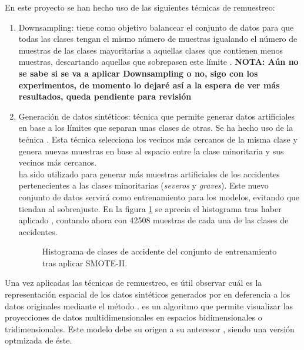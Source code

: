             En este proyecto se han hecho uso de las siguientes técnicas de remuestreo:

            
            \begin{enumerate}



                \item Downsampling: tiene como objetivo balancear el conjunto de datos para que todas las clases tengan el mismo número de muestras igualando el número de muestras de las clases mayoritarias a aquellas clases que contienen menos muestras, descartando aquellas que sobrepasen este límite \cite{Downsampling}. \textbf{NOTA: Aún no se sabe si se va a aplicar Downsampling o no, sigo con los experimentos, de momento lo dejaré así a la espera de ver más resultados, queda pendiente para revisión}
                

                \item Generación de datos sintéticos: técnica que permite generar datos artificiales en base a los límites que separan unas clases de otras. Se ha hecho uso de la tećnica  \cite{SMOTEII}. Esta técnica selecciona los vecinos más cercanos de la misma clase y genera nuevas muestras en base al espacio entre la clase minoritaria y sus vecinos más cercanos.\\

                 ha sido utilizado para generar más muestras artificiales de los accidentes pertenecientes a las clases minoritarias (\textit{severos} y \textit{graves}). Este nuevo conjunto de datos servirá como entrenamiento para los modelos, evitando que tiendan al sobreajuste. En la figura \ref{SMOTEIIDataHistogramImage} se aprecia el histograma tras haber aplicado , contando ahora con 42508 muestras de cada una de las clases de accidentes.

                \begin{figure}[H]
                    \centering
                    
                    \caption{Histograma de clases de accidente del conjunto de entrenamiento tras aplicar SMOTE-II.}
                    \label{SMOTEIIDataHistogramImage}
                 \end{figure}

            \end{enumerate}


            Una vez aplicadas las técnicas de remuestreo, es útil observar cuál es la representación espacial de los datos sintéticos generados por  en deferencia a los datos originales mediante el método  \cite{TSNEPaper}.  es un algoritmo que permite visualizar las proyecciones de datos multidimensionales en espacios bidimensionales o tridimensionales. Este modelo debe su origen a su antecesor , siendo una versión optmizada de éste.

